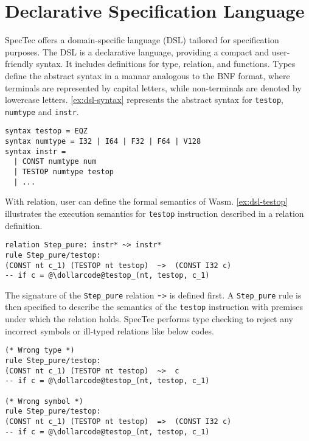 
\chapter{Declarative Specification Language}
\label{ch:dsl}
\noindent


SpecTec offers a domain-specific language (DSL) tailored for specification
purposes.
The DSL is a declarative language, providing a compact and user-friendly syntax.
It includes definitions for type, relation, and functions.
Types define the abstract syntax in a mannar analogous to the BNF format, where
terminals are represented by capital letters, while non-terminals are denoted
by lowercase letters.
\cref{ex:dsl-syntax} represents the abstract syntax for \texttt{testop},
\texttt{numtype} and \texttt{instr}.
\\
\begin{example}
\begin{lstlisting}[style=dsl]
syntax testop = EQZ
syntax numtype = I32 | I64 | F32 | F64 | V128
syntax instr =
  | CONST numtype num
  | TESTOP numtype testop
  | ...
\end{lstlisting}
\label{ex:dsl-syntax}
\end{example}


With relation, user can define the formal semantics of Wasm.
\cref{ex:dsl-testop} illustrates the execution semantics for \texttt{testop}
instruction described in a relation definition.
\\
\begin{example}
\begin{lstlisting}[style=dsl]
relation Step_pure: instr* ~> instr*
rule Step_pure/testop:
(CONST nt c_1) (TESTOP nt testop)  ~>  (CONST I32 c)
-- if c = @\dollarcode@testop_(nt, testop, c_1)
\end{lstlisting}
  \label{ex:dsl-testop}
\end{example}
The signature of the \texttt{Step\_pure} relation $\tildecode$\texttt{>} is
defined first.
A \texttt{Step\_pure} rule is then specified to describe the semantics of the
\texttt{testop} instruction with premises under which the relation holds.
SpecTec performs type checking to reject any incorrect symbols or ill-typed
relations like below codes.
\\
\begin{example}
\begin{lstlisting}[style=dsl]
(* Wrong type *)
rule Step_pure/testop:
(CONST nt c_1) (TESTOP nt testop)  ~>  c
-- if c = @\dollarcode@testop_(nt, testop, c_1)

(* Wrong symbol *)
rule Step_pure/testop:
(CONST nt c_1) (TESTOP nt testop)  =>  (CONST I32 c)
-- if c = @\dollarcode@testop_(nt, testop, c_1)
\end{lstlisting}
  \label{ex:dsl-error}
\end{example}


